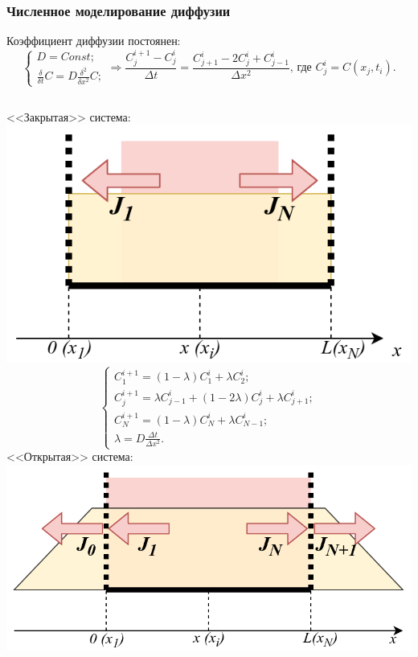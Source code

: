 \documentclass[10pt,pdf,hyperref={unicode},aspectratio={169}]{beamer}
\begin{document}
\begin{frame}
	\frametitle{Численное моделирование диффузии}
	{\color{blue}Коэффициент диффузии постоянен:}
	\begin{equation*}
		\begin{cases}
			D = Const;\\
			\frac{\delta}{\delta t} C = D \frac{\delta^{2}}{\delta x^{2}} C;
		\end{cases} \Rightarrow
		\frac{C^{i+1}_{j} - C^{i}_{j}}{\Delta t} = \frac{C^{i}_{j+1} - 2C^{i}_{j} + C^{i}_{j-1}}{\Delta x^2},\,\text{где }
		C^{i}_{j} = C(x_{j}, t_{i}).
	\end{equation*}

	\begin{columns}
		\centering
		{\color{red}<<Закрытая>> система:}\\
		\includegraphics[width=0.77\linewidth]{assets/CD}
		\small
		\begin{equation*}
		\begin{cases}
			C^{i+1}_{1} = (1 - \lambda)C^{i}_{1} + \lambda C^{i}_{2};\\
			C^{i+1}_{j} = \lambda C^{i}_{j-1} + (1 - 2\lambda)C^{i}_{j} + \lambda C^{i}_{j+1};\\
			C^{i+1}_{N} = (1 - \lambda)C^{i}_{N} + \lambda C^{i}_{N-1};\\
			\lambda = D\frac{\Delta t}{\Delta x^{2}}.
		\end{cases}
		\end{equation*}
		\centering
		{\color{red}<<Открытая>> система:}\\
	   	\includegraphics[width=\linewidth]{assets/OD}

\end{columns}
\end{frame}
\end{document}
